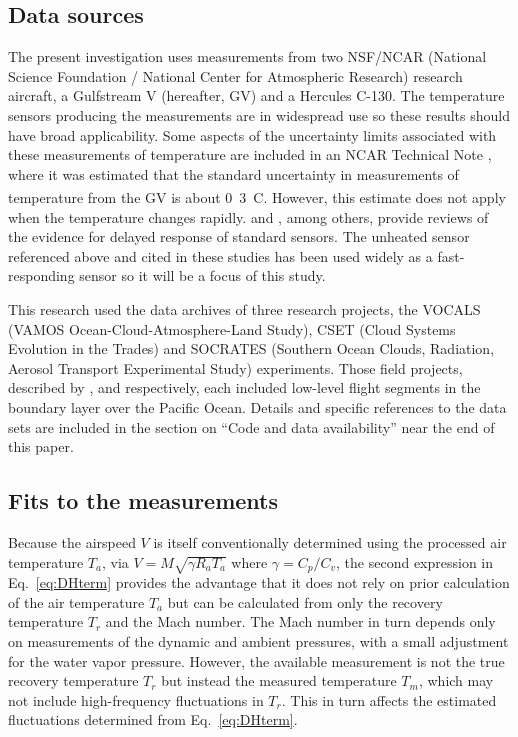 \documentclass[amt, manuscript]{copernicus}
\begin{document}
\subsection{Data sources}

The present investigation uses measurements from two NSF/NCAR (National
Science Foundation / National Center for Atmospheric Research) research
aircraft, a Gulfstream V (hereafter, GV) and a Hercules C-130. The
temperature sensors producing the measurements are in widespread use so
these results should have broad applicability. Some aspects of the
uncertainty limits associated with these measurements of temperature are
included in an NCAR Technical Note \citep{cooper2016ncartn}, where it
was estimated that the standard uncertainty in measurements of
temperature from the GV is about \unit{0.3^{\circ}C}. However, this
estimate does not apply when the temperature changes rapidly.
\citet{FrieheKhelif1992} and \citet{LawsonRodi1992}, among others,
provide reviews of the evidence for delayed response of standard
sensors. The unheated sensor referenced above and cited in these studies
has been used widely as a fast-responding sensor so it will be a focus
of this study.

This research used the data archives of three research projects, the
VOCALS (VAMOS Ocean-Cloud-Atmosphere-Land Study), CSET (Cloud Systems
Evolution in the Trades) and SOCRATES (Southern Ocean Clouds, Radiation,
Aerosol Transport Experimental Study) experiments. Those field projects,
described by \citet{wood2011vamos}, \citet{albrecht2019CSET} and
\citet{mcfarquhar2021observations} respectively, each included low-level
flight segments in the boundary layer over the Pacific Ocean. Details
and specific references to the data sets are included in the section on
``Code and data availability'' near the end of this paper.

\subsection{Fits to the measurements}

Because the airspeed \(V\) is itself conventionally determined using the
processed air temperature \(T_{a}\), via \(V=M\sqrt{\gamma R_{a}T_{a}}\)
where \(\gamma=C_{p}/C_{v}\), the second expression in
Eq.~\eqref{eq:DHterm} provides the advantage that it does not rely on
prior calculation of the air temperature \(T_{a}\) but can be calculated
from only the recovery temperature \(T_{r}\) and the Mach number. The
Mach number in turn depends only on measurements of the dynamic and
ambient pressures, with a small adjustment for the water vapor pressure.
However, the available measurement is not the true recovery temperature
\(T_{r}\) but instead the measured temperature \(T_{m}\), which may not
include high-frequency fluctuations in \(T_{r}\). This in turn affects
the estimated fluctuations determined from Eq.~\eqref{eq:DHterm}.
\end{document}
